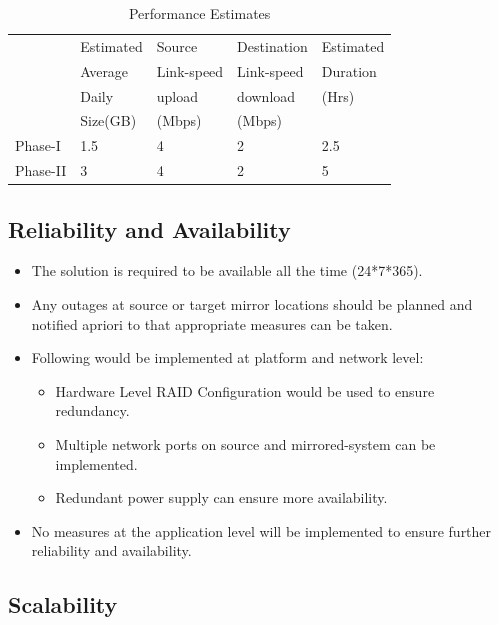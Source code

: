 \documentclass[11pt]{article}
\begin{document}
\begin{table}[H]
\caption{\label{tbl: Performance Estimates}Performance Estimates}
\begin{center}
\begin{tabular}{lllll}
\hline
           &  Estimated  &  Source      &  Destination  &  Estimated  \\
           &  Average    &  Link-speed  &  Link-speed   &  Duration   \\
           &  Daily      &  upload      &  download     &  (Hrs)      \\
           &  Size(GB)   &  (Mbps)      &  (Mbps)       &             \\
\hline
 Phase-I   &  1.5        &  4           &  2            &  2.5        \\
 Phase-II  &  3          &  4           &  2            &  5          \\
\hline
\end{tabular}
\end{center}
\end{table}


\subsection{Reliability and Availability}
\label{sec-8.9}

\begin{itemize}
\item The solution is required to be available all the time (24*7*365).
\item Any outages at source or target mirror locations should be planned
   and notified apriori to that appropriate measures can be taken.
\item Following would be implemented at platform and network level:

\begin{itemize}
\item Hardware Level RAID Configuration would be used to ensure redundancy.
\item Multiple network ports on source and mirrored-system can be implemented.
\item Redundant power supply can ensure more availability.
\end{itemize}

\item No measures at the application level will be implemented to
   ensure further reliability and availability.
\end{itemize}
\subsection{Scalability}
\label{sec-8.10}
\end{document}
